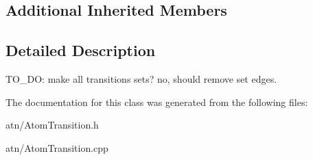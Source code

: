 \subsection*{Additional Inherited Members}


\subsection{Detailed Description}
T\+O\+\_\+\+DO\+: make all transitions sets? no, should remove set edges. 

The documentation for this class was generated from the following files\+:\begin{DoxyCompactItemize}
\item 
atn/Atom\+Transition.\+h\item 
atn/Atom\+Transition.\+cpp\end{DoxyCompactItemize}

